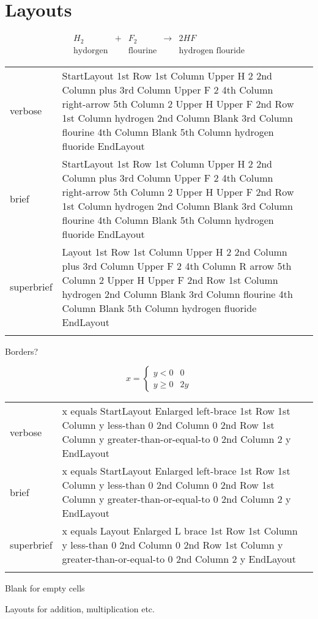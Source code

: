
\section{Layouts}
\label{sec:layouts}

\R
\E \[
\begin{array}{ccccc}
  H_2 & + & F_2 & \rightarrow & 2HF\\
  \text{hydorgen} & & \text{flourine} & & \text{hydrogen flouride}
\end{array}
\]

\begin{longtable}[c]{@{}lll@{}}
\toprule\addlinespace
verbose & StartLayout 1st Row 1st Column Upper H 2 2nd Column plus 3rd
Column Upper F 2 4th Column right-arrow 5th Column 2 Upper H Upper F 2nd
Row 1st Column hydrogen 2nd Column Blank 3rd Column flourine 4th Column
Blank 5th Column hydrogen fluoride EndLayout &

\\\addlinespace
brief & StartLayout 1st Row 1st Column Upper H 2 2nd Column plus 3rd
Column Upper F 2 4th Column right-arrow 5th Column 2 Upper H Upper F 2nd
Row 1st Column hydrogen 2nd Column Blank 3rd Column flourine 4th Column
Blank 5th Column hydrogen fluoride EndLayout &

\\\addlinespace
superbrief & Layout 1st Row 1st Column Upper H 2 2nd Column plus 3rd
Column Upper F 2 4th Column R arrow 5th Column 2 Upper H Upper F 2nd Row
1st Column hydrogen 2nd Column Blank 3rd Column flourine 4th Column
Blank 5th Column hydrogen fluoride EndLayout &

\\\addlinespace
\bottomrule
\end{longtable}

\R
Borders?

\R
\E \[x=\left\{
\begin{array}{cc}
    y<0 & 0\\
    y\geq 0 & 2y
  \end{array}
\right.\]

\begin{longtable}[c]{@{}lll@{}}
\toprule\addlinespace
verbose & x equals StartLayout Enlarged left-brace 1st Row 1st Column y
less-than 0 2nd Column 0 2nd Row 1st Column y greater-than-or-equal-to 0
2nd Column 2 y EndLayout &

\\\addlinespace
brief & x equals StartLayout Enlarged left-brace 1st Row 1st Column y
less-than 0 2nd Column 0 2nd Row 1st Column y greater-than-or-equal-to 0
2nd Column 2 y EndLayout &

\\\addlinespace
superbrief & x equals Layout Enlarged L brace 1st Row 1st Column y
less-than 0 2nd Column 0 2nd Row 1st Column y greater-than-or-equal-to 0
2nd Column 2 y EndLayout &

\\\addlinespace
\bottomrule
\end{longtable}

\R
Blank for empty cells

\R
Layouts for addition, multiplication etc.


